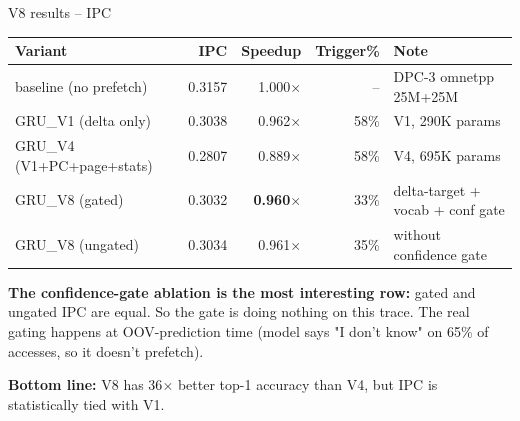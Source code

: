 \documentclass[10pt,aspectratio=169]{beamer}
\begin{document}
\begin{frame}{V8 results -- IPC}
  \begin{center}
  \footnotesize
  \begin{tabular}{lrrrl}
    \toprule
    \textbf{Variant} & \textbf{IPC} & \textbf{Speedup} & \textbf{Trigger\%} & \textbf{Note} \\
    \midrule
    baseline (no prefetch)  & 0.3157 & 1.000$\times$ & --   & DPC-3 omnetpp 25M+25M \\
    GRU\_V1 (delta only)    & 0.3038 & 0.962$\times$ & 58\% & V1, 290K params \\
    GRU\_V4 (V1+PC+page+stats) & 0.2807 & 0.889$\times$ & 58\% & V4, 695K params \\
    \midrule
    GRU\_V8 (gated)         & 0.3032 & \textbf{0.960$\times$} & 33\% & delta-target + vocab + conf gate \\
    GRU\_V8 (ungated)       & 0.3034 & 0.961$\times$ & 35\% & without confidence gate \\
    \bottomrule
  \end{tabular}
  \end{center}

  \vspace{0.6em}
  \textbf{The confidence-gate ablation is the most interesting row:}
  gated and ungated IPC are equal. So the gate is doing nothing on this trace.
  The real gating happens at OOV-prediction time (model says "I don't know" on 65\% of accesses, so it doesn't prefetch).

  \vspace{0.6em}
  \textbf{Bottom line:} V8 has 36$\times$ better top-1 accuracy than V4, but IPC is statistically tied with V1.
\end{frame}
\end{document}
